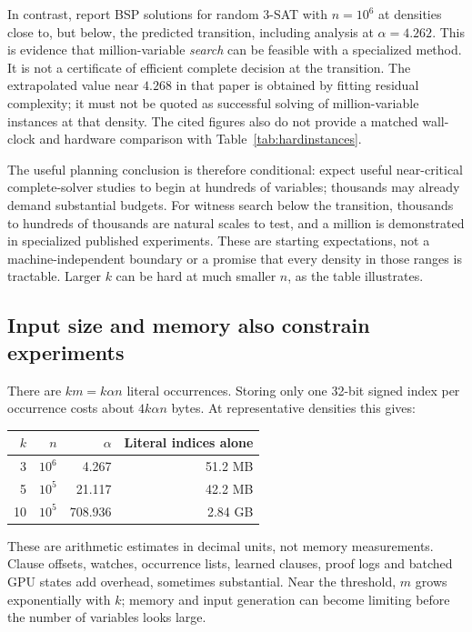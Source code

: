 In contrast, \citet[Figures 3--5]{marino2016} report BSP solutions for
random $3$-SAT with $n=10^6$ at densities close to, but below, the predicted
transition, including analysis at $\alpha=4.262$. This is evidence that
million-variable \emph{search} can be feasible with a specialized method.
It is not a certificate of efficient complete decision at the transition.
The extrapolated value near $4.268$ in that paper is obtained by fitting
residual complexity; it must not be quoted as successful solving of
million-variable instances at that density. The cited figures also do not
provide a matched wall-clock and hardware comparison with Table~\ref{tab:hardinstances}.

The useful planning conclusion is therefore conditional: expect useful
near-critical complete-solver studies to begin at hundreds of variables;
thousands may already demand substantial budgets. For witness search below
the transition, thousands to hundreds of thousands are natural scales to
test, and a million is demonstrated in specialized published experiments.
These are starting expectations, not a machine-independent boundary or a
promise that every density in those ranges is tractable. Larger $k$ can be
hard at much smaller $n$, as the table illustrates.

\subsection{Input size and memory also constrain experiments}
There are $km=k\alpha n$ literal occurrences. Storing only one 32-bit signed
index per occurrence costs about $4k\alpha n$ bytes. At representative
densities this gives:
\begin{center}\small
\begin{tabular}{@{}rrrr@{}}
\toprule
$k$ & $n$ & $\alpha$ & Literal indices alone \\
\midrule
3 & $10^6$ & 4.267 & 51.2 MB \\
5 & $10^5$ & 21.117 & 42.2 MB \\
10 & $10^5$ & 708.936 & 2.84 GB \\
\bottomrule
\end{tabular}
\end{center}
These are arithmetic estimates in decimal units, not memory measurements.
Clause offsets, watches, occurrence lists, learned clauses, proof logs and
batched GPU states add overhead, sometimes substantial. Near the threshold,
$m$ grows exponentially with $k$; memory and input generation can become
limiting before the number of variables looks large.

